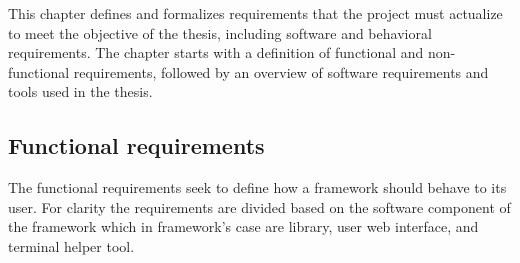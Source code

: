 \documentclass[
    bindingoffset=5mm,  %
    footnoteindent=3mm, %
    hyphenation=true    %
]{src/wut-thesis}
\begin{document}
        This chapter defines and formalizes requirements that the project must actualize
    to meet the objective of the thesis, including software and behavioral requirements.
    The chapter starts with a definition of functional and non-functional requirements,
    followed by an overview of software requirements and tools used in the thesis.

\subsection{Functional requirements}

    The functional requirements seek to define how a framework should behave to its user.
    For clarity the requirements are divided based on the software component of the framework which
    in framework's case are library, user web interface, and terminal helper tool.

\end{document}
